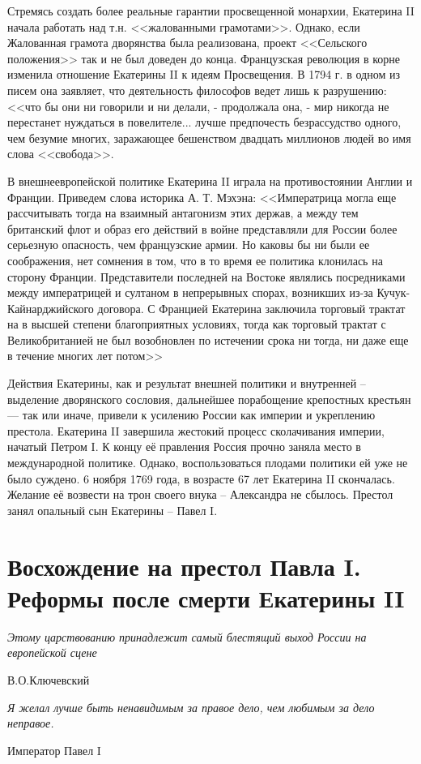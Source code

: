 \documentclass[a4paper,12pt]{diss_4}
\begin{document}
Стремясь создать более реальные гарантии просвещенной монархии, Екатерина II начала работать над т.н. <<жалованными грамотами>>. Однако, если Жалованная грамота дворянства была реализована, проект <<Сельского положения>> так и не был доведен до конца. Французская революция в корне изменила отношение Екатерины II к идеям Просвещения. В 1794 г. в одном из писем она заявляет, что деятельность философов ведет лишь к разрушению: <<что бы они ни говорили и ни делали, - продолжала она, - мир никогда не перестанет нуждаться в повелителе... лучше предпочесть безрассудство одного, чем безумие многих, заражающее бешенством двадцать миллионов людей во имя слова <<свобода>>.

В внешнеевропейской политике Екатерина II играла на противостоянии Англии и Франции. Приведем слова историка А. Т. Мэхэна: <<Императрица могла еще рассчитывать тогда на взаимный антагонизм этих держав, а между тем британский флот и образ его действий в войне представляли для России более серьезную опасность, чем французские армии. Но каковы бы ни были ее соображения, нет сомнения в том, что в то время ее политика клонилась на сторону Франции. Представители последней на Востоке являлись посредниками между императрицей и султаном в непрерывных спорах, возникших из-за Кучук-Кайнарджийского договора. С Францией Екатерина заключила торговый трактат на в высшей степени благоприятных условиях, тогда как торговый трактат с Великобританией не был возобновлен по истечении срока ни тогда, ни даже еще в течение многих лет потом>>


Действия Екатерины, как и результат  внешней политики и внутренней -- выделение дворянского сословия, дальнейшее порабощение крепостных крестьян --- так или иначе, привели к усилению России как империи и укреплению престола. Екатерина II завершила жестокий процесс сколачивания империи, начатый Петром I. К концу её правления Россия прочно заняла место в международной политике. Однако, воспользоваться плодами политики ей уже не было суждено. 6 ноября 1769 года, в возрасте 67 лет Екатерина II скончалась. Желание её возвести на трон своего внука -- Александра не сбылось. Престол занял опальный сын Екатерины -- Павел I. 


\chapter{Восхождение на престол Павла I. Реформы после смерти Екатерины II}
\epigraph{\textit{Этому царствованию принадлежит самый блестящий выход России на европейской сцене}}
{В.О.Ключевский}
\epigraph{\textit{Я желал лучше быть ненавидимым за правое дело, чем любимым за дело неправое.}}
{Император Павел I}
\end{document}
